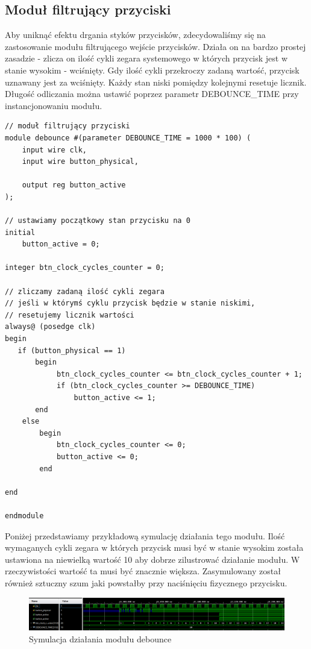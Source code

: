 \documentclass[a4paper]{article}
\begin{document}
\subsection{Moduł filtrujący przyciski}
Aby uniknąć efektu drgania styków przycisków, zdecydowaliśmy się na zastosowanie modułu
filtrującego wejście przycisków. Działa on na bardzo prostej zasadzie - zlicza on ilość 
cykli zegara systemowego w których przycisk jest w stanie wysokim - wciśnięty. Gdy ilość
cykli przekroczy zadaną wartość, przycisk uznawany jest za wciśnięty. Każdy stan niski 
pomiędzy kolejnymi resetuje licznik. Długość odliczania można ustawić poprzez
parametr DEBOUNCE\_TIME przy instancjonowaniu modułu.
\begin{verbatim}
// moduł filtrujący przyciski
module debounce #(parameter DEBOUNCE_TIME = 1000 * 100) (
    input wire clk,
    input wire button_physical,
    
    output reg button_active
);

// ustawiamy początkowy stan przycisku na 0
initial
    button_active = 0;

integer btn_clock_cycles_counter = 0;

// zliczamy zadaną ilość cykli zegara 
// jeśli w którymś cyklu przycisk będzie w stanie niskimi,
// resetujemy licznik wartości
always@ (posedge clk)
begin
   if (button_physical == 1)
       begin
            btn_clock_cycles_counter <= btn_clock_cycles_counter + 1;
            if (btn_clock_cycles_counter >= DEBOUNCE_TIME) 
                button_active <= 1;
       end
    else 
        begin
            btn_clock_cycles_counter <= 0;
            button_active <= 0;
        end
        
end

endmodule
\end{verbatim}

Poniżej przedstawiamy przykładową symulację działania tego modułu.
Ilość wymaganych cykli zegara w których przycisk musi być w stanie wysokim została ustawiona na niewielką wartość 10 aby dobrze zilustrować działanie modułu. W rzeczywistości wartość ta musi być znacznie większa. Zasymulowany został również sztuczny szum jaki powstałby przy naciśnięciu fizycznego przycisku.

\begin{figure}[H]
    \centering
    \includegraphics[width=\textwidth]{debounce_simulation2.png}
    \caption{Symulacja działania modułu debounce}
\end{figure}
\end{document}

